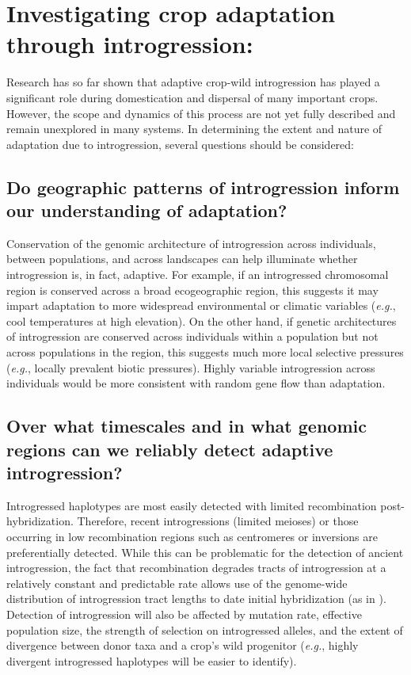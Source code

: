 \documentclass[11pt]{article}
\begin{document}
\section*{Investigating crop adaptation through introgression:}

Research has so far shown that adaptive crop-wild introgression has played a significant role during domestication and dispersal of many important crops.
However, the scope and dynamics of this process are not yet fully described and remain unexplored in many systems.
In determining the extent and nature of adaptation due to introgression, several questions should be considered:

\subsection*{Do geographic patterns of introgression inform our understanding of adaptation?}
Conservation of the genomic architecture of introgression across individuals,  between populations, and across landscapes can help illuminate whether introgression is, in fact, adaptive.
For example, if an introgressed chromosomal region is conserved across a broad ecogeographic region, this suggests it may impart adaptation to more widespread environmental or climatic variables (\emph{e.g.}, cool temperatures at high elevation).
On the other hand, if genetic architectures of introgression are conserved across individuals within a population but not across populations in the region, this suggests much more local selective pressures (\emph{e.g.}, locally prevalent biotic pressures).
Highly variable introgression across individuals would be more consistent with random gene flow than adaptation.

\subsection*{Over what timescales and in what genomic regions can we reliably detect adaptive introgression?}
Introgressed haplotypes are most easily detected with limited recombination post-hybridization.
Therefore, recent introgressions (limited meioses) or those occurring in low recombination regions such as centromeres or inversions are preferentially detected.
While this can be problematic for the detection of ancient introgression, the fact that recombination degrades tracts of introgression at a relatively constant and predictable rate allows use of the genome-wide distribution of introgression tract lengths to date initial hybridization (as in \cite{Poets2015}).
Detection of introgression will also be affected by mutation rate, effective population size, the strength of selection on introgressed alleles, and the extent of divergence between donor taxa and a crop's wild progenitor (\emph{e.g.}, highly divergent introgressed haplotypes will be easier to identify).
\end{document}
